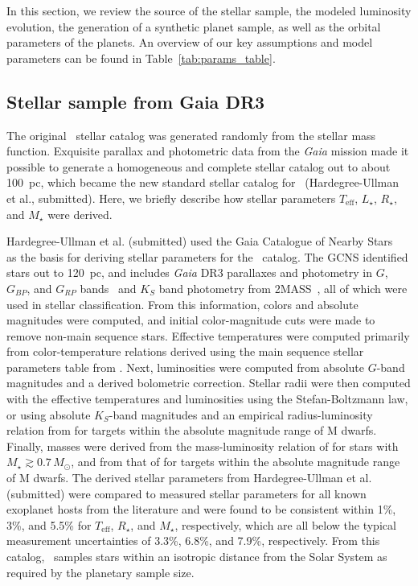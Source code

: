 \documentclass[twocolumn,twocolappendix]{aastex631}
\begin{document}
In this section, we review the source of the stellar sample, the modeled luminosity evolution, the generation of a synthetic planet sample, as well as the orbital parameters of the planets.
An overview of our key assumptions and model parameters can be found in Table~\ref{tab:params_table}.

\subsection{Stellar sample from Gaia DR3}
The original \bioverse\ stellar catalog was generated randomly from the \citet{Chabrier2003} stellar mass function. Exquisite parallax and photometric data from the \textit{Gaia} mission made it possible to generate a homogeneous and complete stellar catalog out to about 100~pc, which became the new standard stellar catalog for \bioverse ~(Hardegree-Ullman et al., submitted). Here, we briefly describe how stellar parameters $T_{\mathrm{eff}}$, $L_{\star}$, $R_{\star}$, and $M_{\star}$ were derived.

Hardegree-Ullman et al. (submitted) used the Gaia Catalogue of Nearby Stars~\citep[hereafter GCNS,][]{Smart2021} as the basis for deriving stellar parameters for the \bioverse\ catalog.
The GCNS identified stars out to 120~pc, and includes \textit{Gaia} DR3 parallaxes and photometry in $G$, $G_{BP}$, and $G_{RP}$ bands~\citep{GaiaCollaboration2021} and $K_S$ band photometry from 2MASS~\citep{Cutri2003}, all of which were used in stellar classification.
From this information, colors and absolute magnitudes were computed, and initial color-magnitude cuts were made to remove non-main sequence stars.
Effective temperatures were computed primarily from color-temperature relations derived using the main sequence stellar parameters table from \citet{Pecaut2013}.
Next, luminosities were computed from absolute $G$-band magnitudes and a derived bolometric correction.
Stellar radii were then computed with the effective temperatures and luminosities using the Stefan-Boltzmann law, or using absolute $K_S$-band magnitudes and an empirical radius-luminosity relation from \citet{Mann2015} for targets within the absolute magnitude range of M dwarfs.
Finally, masses were derived from the mass-luminosity relation of \citet{Torres2010} for stars with $M_{\star}\gtrsim 0.7\,M_{\odot}$, and from that of \citet{Mann2019} for targets within the absolute magnitude range of M dwarfs.
The derived stellar parameters from Hardegree-Ullman et al. (submitted) were compared to measured stellar parameters for all known exoplanet hosts from the literature and were found to be consistent within 1\%, 3\%, and 5.5\% for $T_{\mathrm{eff}}$, $R_{\star}$, and $M_{\star}$, respectively, which are all below the typical measurement uncertainties of 3.3\%, 6.8\%, and 7.9\%, respectively.
From this catalog, \bioverse\ samples stars within an isotropic distance from the Solar System as required by the planetary sample size.
\end{document}
